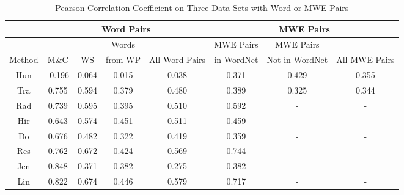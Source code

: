 \begin{table*}[th]
\centering
\caption{Pearson Correlation Coefficient on Three Data Sets
with Word or MWE Pairs}
\label{tab:benchmarkData}
\small{
\begin{tabular}{|c|c|c|c|c||c|c|c|}\hline
&	\multicolumn{4}{c||}{Word Pairs} &\multicolumn{3}{c|}{MWE Pairs}\\\hline
	&	& & Words & & MWE Pairs & MWE Pairs & \\ %
Method	&M\&C &WS & from WP & All Word Pairs &in WordNet &Not in WordNet & All MWE Pairs \\ \hline\hline %
Hun	&-0.196	&0.064 &0.015&0.038 &0.371 &0.429&0.355\\ \hline %
Tra	&0.755	&0.594 &0.379&0.480 &0.389 &0.325&0.344\\ \hline %
Rad&0.739	&0.595&0.395&0.510&0.592	&-&-\\ \hline %
Hir	&0.643	&0.574&0.451&0.511&0.459	&-&-\\ \hline %
Do	&0.676	&0.482&0.322&0.419&0.359	&-&-\\ \hline %
Res&0.762	&0.672&0.424&0.569&0.744	&-&-\\ \hline %
Jcn&0.848	&0.371&0.382&0.275&0.382	&-&-\\ \hline %
Lin&0.822	&0.674&0.446&0.579&0.717	&-&-\\ \hline %

\end{tabular}}
\end{table*}
